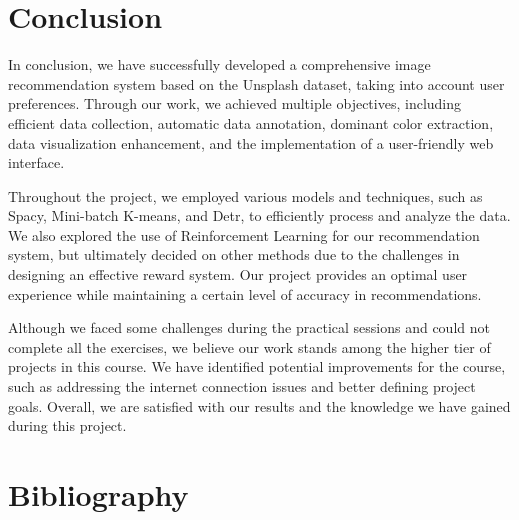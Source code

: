 \documentclass{article}
\begin{document}
    \section{Conclusion}\label{sec:conclusion}

    In conclusion, we have successfully developed a comprehensive image recommendation system based on the Unsplash dataset, taking into account user preferences.
    Through our work, we achieved multiple objectives, including efficient data collection, automatic data annotation, dominant color extraction, data visualization enhancement, and the implementation of a user-friendly web interface.

    Throughout the project, we employed various models and techniques, such as Spacy, Mini-batch K-means, and Detr, to efficiently process and analyze the data.
    We also explored the use of Reinforcement Learning for our recommendation system, but ultimately decided on other methods due to the challenges in designing an effective reward system.
    Our project provides an optimal user experience while maintaining a certain level of accuracy in recommendations.

    Although we faced some challenges during the practical sessions and could not complete all the exercises, we believe our work stands among the higher tier of projects in this course.
    We have identified potential improvements for the course, such as addressing the internet connection issues and better defining project goals.
    Overall, we are satisfied with our results and the knowledge we have gained during this project.

    \newpage

    \section{Bibliography}\label{sec:bibliography}
\end{document}
